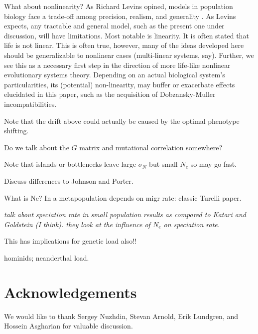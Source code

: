 \documentclass{article}
\newcommand{\jss}[1]{{\color{olive}\it #1}}
\newcommand{\1}{\mathbbm{1}}
\begin{document}
What about nonlinearity?
As Richard Levins opined, models in population biology face a trade-off among precision, realism, and generality \citep{levins1966strategy}. As Levins expects, any tractable and general model, such as the present one under discussion, will have limitations. Most notable is linearity. It is often stated that life is not linear. This is often true, however, many of the ideas developed here should be generalizable to nonlinear cases (multi-linear systems, say). Further, we see this as a necessary first step in the direction of more life-like nonlinear evolutionary systems theory. Depending on an actual biological system's particularities, its (potential) non-linearity, may buffer or exacerbate effects elucidated in this paper, such as the acquisition of Dobzansky-Muller incompatibilities.

Note that the drift above could actually be caused by the optimal phenotype shifting.

Do we talk about the $G$ matrix and mutational correlation somewhere?


Note that islands or bottlenecks leave large $\sigma_N$ but small $N_e$ so may go fast.

Discuss differences to Johnson and Porter.

What is Ne?  In a metapopulation depends on migr rate: classic Turelli paper.

\jss{talk about speciation rate in small population results as compared to Katari and Goldstein (I think). they look at the influence of $N_e$ on speciation rate.}

This has implications for genetic load also!!

hominids; neanderthal load.


\section*{Acknowledgements}
We would like to thank Sergey Nuzhdin, Stevan Arnold, Erik Lundgren, and Hossein Asgharian for valuable discussion.
\end{document}
